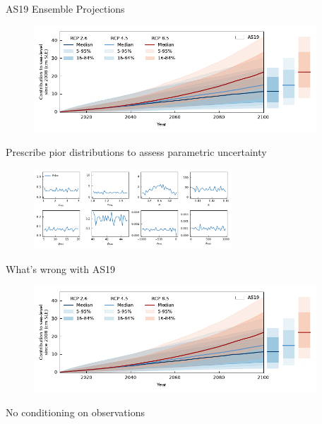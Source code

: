 \documentclass[hide notes,intlimits]{beamer}
\begin{document}
\begin{frame}{AS19 Ensemble Projections}
  \begin{minipage}[t][4cm][t]{\textwidth}
    \begin{figure}
      \includegraphics[height=4cm]{projection_as19_bars}
    \end{figure}
  \end{minipage}
  \alert{Prescribe pior distributions to assess parametric uncertainty}
  \begin{minipage}[t][3cm][t]{\textwidth}
    \begin{figure}
      \includegraphics[height=3cm]{prior}
    \end{figure}
  \end{minipage}
\end{frame}



\begin{frame}{What's wrong with AS19}
  \begin{minipage}[t][4cm][t]{\textwidth}
    \begin{figure}
      \includegraphics[height=4cm]{projection_as19_bars}
    \end{figure}
  \end{minipage}
  \alert{No conditioning on observations}
  \begin{minipage}[t][3cm][t]{\textwidth}
  \end{minipage}
\end{frame}
\end{document}
